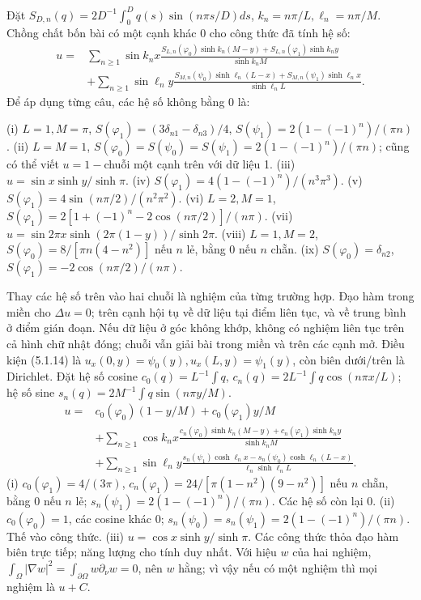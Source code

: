 Đặt $S_{D,n}(q)=2D^{-1}\int_0^Dq(s)\sin(n\pi s/D)ds$, $k_n=n\pi/L,\ell_n=n\pi/M$. Chồng chất bốn bài có một cạnh khác 0 cho công thức đã tính hệ số:
\begin{align*}
u={}&\sum_{n\ge1}\sin k_nx\frac{S_{L,n}(\varphi_0)\sinh k_n(M-y)+S_{L,n}(\varphi_1)\sinh k_ny}{\sinh k_nM}\\
&+\sum_{n\ge1}\sin\ell_ny\frac{S_{M,n}(\psi_0)\sinh\ell_n(L-x)+S_{M,n}(\psi_1)\sinh\ell_nx}{\sinh\ell_nL}.
\end{align*}
Để áp dụng từng câu, các hệ số không bằng 0 là:

(i) $L=1,M=\pi$, $S(\varphi_1)=(3\delta_{n1}-\delta_{n3})/4$, $S(\psi_1)=2(1-(-1)^n)/(\pi n)$.
(ii) $L=M=1$, $S(\varphi_0)=S(\psi_0)=S(\psi_1)=2(1-(-1)^n)/(\pi n)$; cũng có thể viết $u=1-$chuỗi một cạnh trên với dữ liệu 1.
(iii) $u=\sin x\sinh y/\sinh\pi$.
(iv) $S(\varphi_1)=4(1-(-1)^n)/(n^3\pi^3)$.
(v) $S(\varphi_1)=4\sin(n\pi/2)/(n^2\pi^2)$.
(vi) $L=2,M=1$, $S(\varphi_1)=2[1+(-1)^n-2\cos(n\pi/2)]/(n\pi)$.
(vii) $u=\sin2\pi x\sinh(2\pi(1-y))/\sinh2\pi$.
(viii) $L=1,M=2$, $S(\varphi_0)=8/[\pi n(4-n^2)]$ nếu $n$ lẻ, bằng 0 nếu $n$ chẵn.
(ix) $S(\varphi_0)=\delta_{n2}$, $S(\varphi_1)=-2\cos(n\pi/2)/(n\pi)$.

Thay các hệ số trên vào hai chuỗi là nghiệm của từng trường hợp. Đạo hàm trong miền cho $\Delta u=0$; trên cạnh hội tụ về dữ liệu tại điểm liên tục, và về trung bình ở điểm gián đoạn. Nếu dữ liệu ở góc không khớp, không có nghiệm liên tục trên cả hình chữ nhật đóng; chuỗi vẫn giải bài trong miền và trên các cạnh mở.
Điều kiện (5.1.14) là $u_x(0,y)=\psi_0(y),u_x(L,y)=\psi_1(y)$, còn biên dưới/trên là Dirichlet. Đặt hệ số cosine $c_0(q)=L^{-1}\int q$, $c_n(q)=2L^{-1}\int q\cos(n\pi x/L)$; hệ số sine $s_n(q)=2M^{-1}\int q\sin(n\pi y/M)$.
\begin{align*}
u={}&c_0(\varphi_0)(1-y/M)+c_0(\varphi_1)y/M\\
&+\sum_{n\ge1}\cos k_nx\frac{c_n(\varphi_0)\sinh k_n(M-y)+c_n(\varphi_1)\sinh k_ny}{\sinh k_nM}\\
&+\sum_{n\ge1}\sin\ell_ny\frac{s_n(\psi_1)\cosh\ell_nx-s_n(\psi_0)\cosh\ell_n(L-x)}{\ell_n\sinh\ell_nL}.
\end{align*}
(i) $c_0(\varphi_1)=4/(3\pi)$, $c_n(\varphi_1)=24/[\pi(1-n^2)(9-n^2)]$ nếu $n$ chẵn, bằng 0 nếu $n$ lẻ; $s_n(\psi_1)=2(1-(-1)^n)/(\pi n)$. Các hệ số còn lại 0.
(ii) $c_0(\varphi_0)=1$, các cosine khác 0; $s_n(\psi_0)=s_n(\psi_1)=2(1-(-1)^n)/(\pi n)$. Thế vào công thức.
(iii) $u=\cos x\sinh y/\sinh\pi$. Các công thức thỏa đạo hàm biên trực tiếp; năng lượng cho tính duy nhất.
Với hiệu $w$ của hai nghiệm, $\int_\Omega|\nabla w|^2=\int_{\partial\Omega}w\partial_\nu w=0$, nên $w$ hằng; vì vậy nếu có một nghiệm thì mọi nghiệm là $u+C$.

